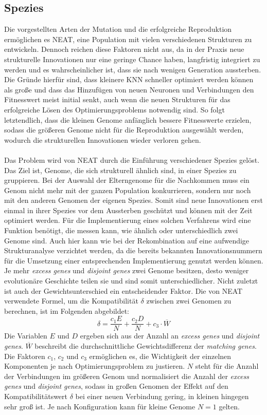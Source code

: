 \subsection{Spezies}
\label{subsec:neat_species}
Die vorgestellten Arten der Mutation und die erfolgreiche Reproduktion ermöglichen es \ac{NEAT}, eine Population mit vielen verschiedenen Strukturen zu entwickeln. Dennoch reichen diese Faktoren nicht aus, da in der Praxis neue strukturelle Innovationen nur eine geringe Chance haben, langfristig integriert zu werden und es wahrscheinlicher ist, dass sie nach wenigen Generation aussterben. Die Gründe hierfür sind, dass kleinere \ac{KNN} schneller optimiert werden können als große und dass das Hinzufügen von neuen Neuronen und Verbindungen den Fitnesswert meist initial senkt, auch wenn die neuen Strukturen für das erfolgreiche Lösen des Optimierungsproblems notwendig sind. So folgt letztendlich, dass die kleinen Genome anfänglich bessere Fitnesswerte erzielen, sodass die größeren Genome nicht für die Reproduktion ausgewählt werden, wodurch die strukturellen Innovationen wieder verloren gehen.
\\\\
Das Problem wird von \ac{NEAT} durch die Einführung verschiedener Spezies gelöst. Das Ziel ist, Genome, die sich strukturell ähnlich sind, in einer Spezies zu gruppieren. Bei der Auswahl der Elterngenome für die Nachkommen muss ein Genom nicht mehr mit der ganzen Population konkurrieren, sondern nur noch mit den anderen Genomen der eigenen Spezies. Somit sind neue Innovationen erst einmal in ihrer Spezies vor dem Aussterben geschützt und können mit der Zeit optimiert werden. Für die Implementierung eines solchen Verfahrens wird eine Funktion benötigt, die messen kann, wie ähnlich oder unterschiedlich zwei Genome sind. Auch hier kann wie bei der Rekombination auf eine aufwendige Strukturanalyse verzichtet werden, da die bereits bekannten Innovationsnummern für die Umsetzung einer entsprechenden Implementierung genutzt werden können. Je mehr \emph{excess genes} und \emph{disjoint genes} zwei Genome besitzen, desto weniger evolutionäre Geschichte teilen sie und sind somit unterschiedlicher. Nicht zuletzt ist auch der Gewichtsunterschied ein entscheidender Faktor. Die von \ac{NEAT} verwendete Formel, um die Kompatibilität $\delta$ zwischen zwei Genomen zu berechnen, ist im Folgenden abgebildet:
$$\delta=\frac{c_1E}{N}+\frac{c_2D}{N}+c_3 \cdot \overline{W}$$
Die Variablen $E$ und $D$ ergeben sich aus der Anzahl an \emph{excess genes} und \emph{disjoint genes}. $\overline{W}$ beschreibt die durchschnittliche Gewichtsdifferenz der \emph{matching genes}. Die Faktoren $c_1$, $c_2$ und $c_3$ ermöglichen es, die Wichtigkeit der einzelnen Komponenten je nach Optimierungsproblem zu justieren. $N$ steht für die Anzahl der Verbindungen im größeren Genom und normalisiert die Anzahl der \emph{excess genes} und \emph{disjoint genes}, sodass in großen Genomen der Effekt auf den Kompatibilitätswert $\delta$ bei einer neuen Verbindung gering, in kleinen hingegen sehr groß ist. Je nach Konfiguration kann für kleine Genome $N=1$ gelten.
